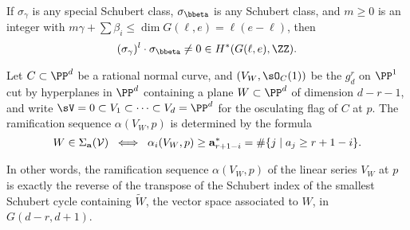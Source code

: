 \begin{corollary}\label{intersection with sigma nonzero}
If $\sigma_\gamma$ is any special Schubert class, $\sigma_{\bbeta}$ is any Schubert class,
and $m\geq 0$ is an integer with $m \gamma + \sum \beta_i \leq \dim G(\ell, e) = \ell(e-\ell)$, then   
$$
(\sigma_\gamma)^l \cdot \sigma_{\bbeta} \neq 0 \in H^*(G(\ell, e), \ZZ).
$$
\end{corollary}

%
%
%
%
\begin{proposition}\label{ramification}
Let $C \subset \PP^d$ be a rational normal curve, and $(V_W, \sO_C(1))$ be the $g^r_d$ on $\PP^1$ cut by hyperplanes in $\PP^d$ containing a plane $W \subset \PP^d$ of dimension $d-r-1$, and write $\sV = 0\subset V_1\subset \cdots \subset V_d = \PP^d$ for the osculating flag of $C$ at $p$. The ramification sequence $\alpha(V_W, p)$
is determined by the formula
%
$$
W \in \Sigma_{\bf a}({\cal V}) \; \iff \; \alpha_i(V_W, p) \geq {\bf a}^*_{r+1-i} = \#\{j\mid a_j\geq r+1-i\}.
$$
\end{proposition} 
\def\tL{{\widetilde W}}
\def\tsV{{\widetilde \sV}}
\def\tV{{\widetilde V}}
In other words, the ramification sequence $\alpha(V_W, p)$ of the linear series $V_W$ at $p$ is exactly the reverse of the transpose of the Schubert index of the smallest Schubert cycle containing $\tL$, the vector
space associated to $W$, in  $G(d-r, d+1)$.

